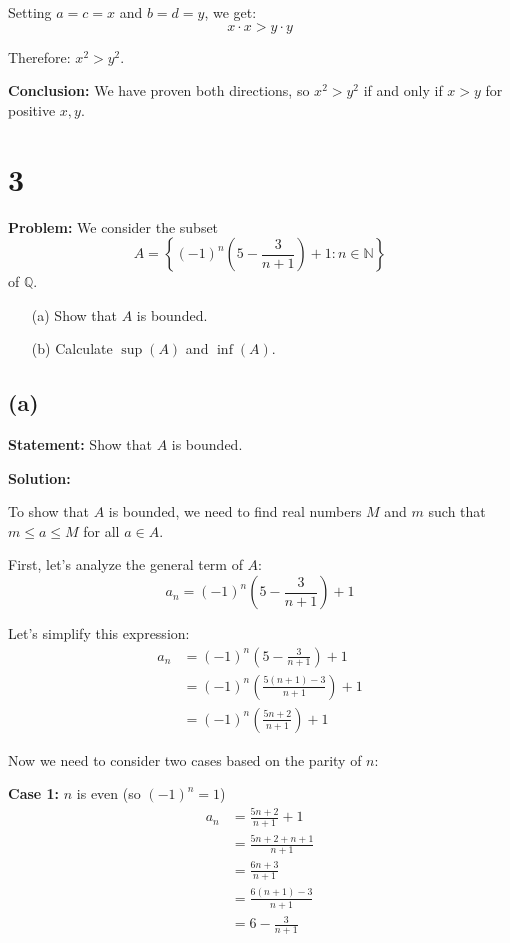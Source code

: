 \documentclass[12pt,a4paper]{article}
\theoremstyle{definition}
\theoremstyle{remark}
\begin{document}
Setting $a = c = x$ and $b = d = y$, we get:
$$x \cdot x > y \cdot y$$

Therefore: $x^2 > y^2$.

\textbf{Conclusion:} We have proven both directions, so $x^2 > y^2$ if and only if $x > y$ for positive $x, y$.


\section*{3}

\textbf{Problem:} We consider the subset 
$$A = \left\{(-1)^n \left(5 - \frac{3}{n+1}\right) + 1 : n \in \mathbb{N}\right\}$$
of $\mathbb{Q}$.

\begin{enumerate}
\item[(a)] Show that $A$ is bounded.
\item[(b)] Calculate $\sup(A)$ and $\inf(A)$.
\end{enumerate}

\subsection*{(a)}

\textbf{Statement:} Show that $A$ is bounded.

\textbf{Solution:}

To show that $A$ is bounded, we need to find real numbers $M$ and $m$ such that $m \leq a \leq M$ for all $a \in A$.

First, let's analyze the general term of $A$:
$$a_n = (-1)^n \left(5 - \frac{3}{n+1}\right) + 1$$

Let's simplify this expression:
\begin{align}
a_n &= (-1)^n \left(5 - \frac{3}{n+1}\right) + 1\\
&= (-1)^n \left(\frac{5(n+1) - 3}{n+1}\right) + 1\\
&= (-1)^n \left(\frac{5n + 2}{n+1}\right) + 1
\end{align}

Now we need to consider two cases based on the parity of $n$:

\textbf{Case 1:} $n$ is even (so $(-1)^n = 1$)
\begin{align}
a_n &= \frac{5n + 2}{n+1} + 1\\
&= \frac{5n + 2 + n + 1}{n+1}\\
&= \frac{6n + 3}{n+1}\\
&= \frac{6(n+1) - 3}{n+1}\\
&= 6 - \frac{3}{n+1}
\end{align}
\end{document}
